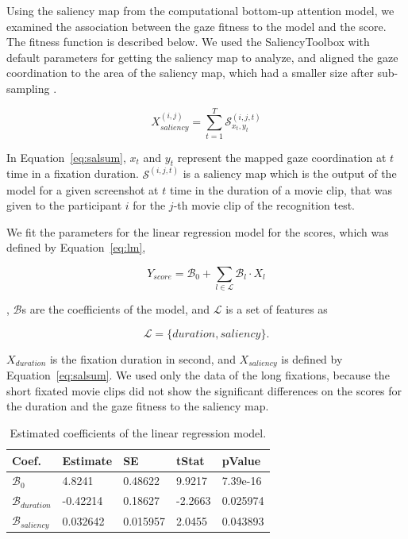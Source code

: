 \documentclass[oneside,master]{snueethesis}
\begin{document}
Using the saliency map from the computational bottom-up attention model, we examined the association between the gaze fitness to the model and the score. The fitness function is described below. We used the SaliencyToolbox with default parameters for getting the saliency map to analyze, and aligned the gaze coordination to the area of the saliency map, which had a smaller size after sub-sampling \cite{Walther2006}.

\begin{equation}\label{eq:salsum}
X_{saliency}^{(i,j)} = \sum_{t=1}^{T} \mathcal{S}_{x_{t},y_{t}}^{(i,j,t)}
\end{equation}

In Equation~\ref{eq:salsum}, $x_{t}$ and $y_{t}$ represent the mapped gaze coordination at $t$ time in a fixation duration. $\mathcal{S}^{(i,j,t)}$ is a saliency map which is the output of the model for a given screenshot at $t$ time in the duration of a movie clip, that was given to the participant $i$ for the $j$-th movie clip of the recognition test.

We fit the parameters for the linear regression model for the scores, which was defined by Equation~\ref{eq:lm},

\begin{equation}\label{eq:lm}
Y_{score} = \mathcal{B}_{0} + \sum_{l \in \mathcal{L}} \mathcal{B}_{l} \cdot X_{l}
\end{equation}

\noindent, $\mathcal{B}$s are the coefficients of the model, and $\mathcal{L}$ is a set of features as  

\begin{equation}\label{eq:l}
\mathcal{L} = \{duration, saliency\}.
\end{equation}

$X_{duration}$ is the fixation duration in second, and $X_{saliency}$ is defined by Equation~\ref{eq:salsum}. We used only the data of the long fixations, because the short fixated movie clips did not show the significant differences on the scores for the duration and the gaze fitness to the saliency map.

\begin{table}[ht]
\begin{center} 
\caption[Estimated coefficients of the linear regression model]{Estimated coefficients of the linear regression model.}
\vskip 0.12in
\label{tab:lr-coef} 
\begin{tabular}{lllll} 
\hline
Coef. & Estimate & SE & tStat & pValue \\ 
\hline
$\mathcal{B}_{0}$    &  4.8241   &  0.48622  &  9.9217 &  7.39e-16  \\
$\mathcal{B}_{duration}$ & -0.42214  &  0.18627  & -2.2663 &  0.025974    \\
$\mathcal{B}_{saliency}$ &  0.032642 &  0.015957 &  2.0455 &  0.043893    \\
\hline
\end{tabular} 
\end{center} 
\end{table}
\end{document}
